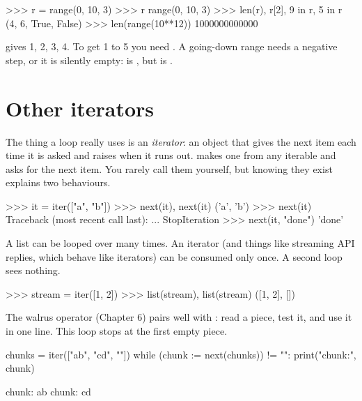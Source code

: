 \begin{pycode}
>>> r = range(0, 10, 3)
>>> r
range(0, 10, 3)
>>> len(r), r[2], 9 in r, 5 in r
(4, 6, True, False)
>>> len(range(10**12))
1000000000000
\end{pycode}

\begin{trap}
 gives 1, 2, 3, 4. To get 1 to 5 you need . A going-down range
needs a negative step, or it is silently empty:  is \code{[]}, but
 is \code{[5, 4, 3]}.
\end{trap}

\section{Other iterators}

The thing a  loop really uses is an \emph{iterator}: an object that gives the next item each time
it is asked and raises  when it runs out.  makes one from any iterable and
 asks for the next item. You rarely call them yourself, but knowing they exist explains two
behaviours.

\begin{pycode}
>>> it = iter(["a", "b"])
>>> next(it), next(it)
('a', 'b')
>>> next(it)
Traceback (most recent call last):
  ...
StopIteration
>>> next(it, "done")
'done'
\end{pycode}

\begin{trap}
A list can be looped over many times. An iterator (and things like streaming API replies, which behave
like iterators) can be consumed only once. A second loop sees nothing.
\end{trap}

\begin{pycode}
>>> stream = iter([1, 2])
>>> list(stream), list(stream)
([1, 2], [])
\end{pycode}

The walrus operator (Chapter 6) pairs well with : read a piece, test it, and use it in one
line. This loop stops at the first empty piece.

\begin{pycode}
chunks = iter(["ab", "cd", ""])
while (chunk := next(chunks)) != "":
    print("chunk:", chunk)
\end{pycode}
\begin{rawcode}
chunk: ab
chunk: cd
\end{rawcode}

